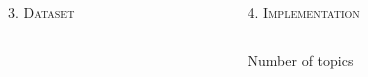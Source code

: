 \documentclass[fleqn,final]{beamer}
\begin{document}
\begin{frame}
\begin{columns}[t]
\begin{column}{.50\linewidth}
\begin{block}{\rule[-2.5mm]{0cm}{1cm}\textsc{3. Dataset}}
\vspace{-0.5cm}                                            

\end{block}





  \end{column}

    \begin{column}{.46\linewidth}
  

    
\begin{block}{\rule[-2.5mm]{0cm}{1cm}\textsc{4. Implementation}}

\vspace{-1.3cm}
\begin{column}{.98\linewidth}
\begin{block}{\small{Number of topics}}

\begin{figure}[ht]
\centering
{}
\centering
\label{figure:ntopics}
\end{figure}


\end{block}
\end{column}
\end{block}
\end{column}
\end{columns}
\end{frame}
\end{document}
